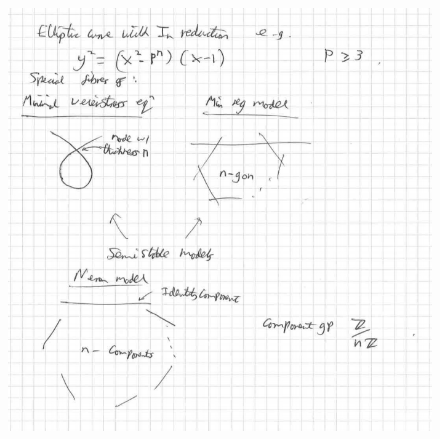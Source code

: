 \documentclass[12pt]{amsart}
\numberwithin{equation}{section}
\theoremstyle{remark}
\theoremstyle{definition}
\theoremstyle{definition}
\theoremstyle{definition}
\theoremstyle{definition}
\theoremstyle{definition}
\theoremstyle{definition}
\begin{document}
\begin{figure} [!htb] 
\includegraphics[angle=0,scale=0.6]{elliptic_neron}
\end{figure}


%

%
%
\end{document}

